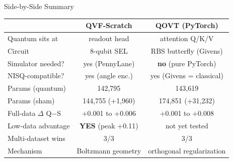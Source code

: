 \documentclass[aspectratio=169]{beamer}
\newcommand{\win}[1]{\textcolor{good}{\textbf{#1}}}
\begin{document}
\begin{frame}{Side-by-Side Summary}
\small
\begin{tabular}{@{}p{3.8cm}cc@{}}
\toprule
 & \textbf{QVF-Scratch} & \textbf{QOVT (PyTorch)} \\
\midrule
Quantum sits at & readout head & attention Q/K/V \\
Circuit & 8-qubit SEL & RBS butterfly (Givens) \\
Simulator needed? & yes (PennyLane) & \textbf{no} (pure PyTorch) \\
NISQ-compatible? & yes (angle enc.) & yes (Givens = classical) \\
Params (quantum) & 142,795 & 143,619 \\
Params (sham) & 144,755 (+1,960) & 174,851 (+31,232) \\
Full-data $\Delta$ Q$-$S & +0.001 to +0.006 & +0.001 to +0.008 \\
Low-data advantage & \win{YES} (peak +0.11) & not yet tested \\
Multi-dataset wins & 3/3 & 3/3 \\
Mechanism & Boltzmann geometry & orthogonal regularization \\
\bottomrule
\end{tabular}
\end{frame}
\end{document}
